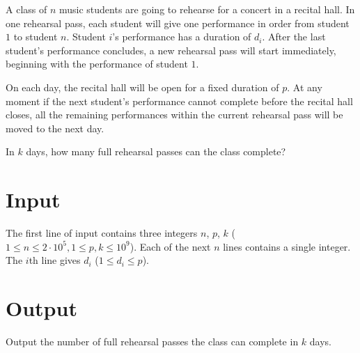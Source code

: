 
A class of $n$ music students are going to rehearse for a concert in a recital hall.
In one rehearsal pass, each student will give one performance in order from student $1$ to student $n$.
Student $i$'s performance has a duration of $d_i$.
After the last student's performance concludes, a new rehearsal pass will start immediately, beginning with the performance of student $1$.

On each day, the recital hall will be open for a fixed duration of $p$.
At any moment if the next student's performance cannot complete before the recital hall closes, all the remaining performances within the current rehearsal pass will be moved to the next day.

In $k$ days, how many full rehearsal passes can the class complete?

\section*{Input}
The first line of input contains three integers $n$, $p$, $k$ ($1 \le n \le 2 \cdot 10^5, 1 \leq p, k \leq 10^9$).
Each of the next $n$ lines contains a single integer. The $i$th line gives $d_i$ ($1 \leq d_i \leq p$).


\section*{Output}
Output the number of full rehearsal passes the class can complete in $k$ days.
